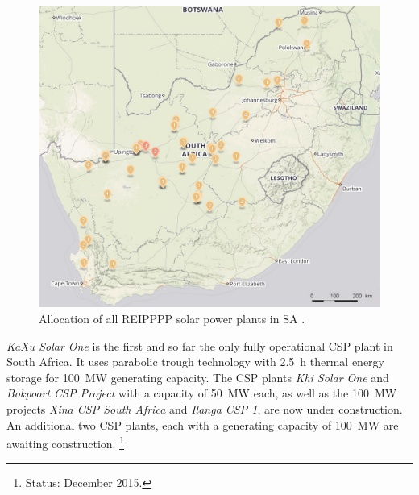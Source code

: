 \begin{figure}[h!]
\centering
\includegraphics[width=1\linewidth]{FIG/Solar-map}
\caption[Allocation of all REIPPPP solar power plants in SA.]{Allocation of all REIPPPP solar power plants in SA \cite{Forder2015}.}\label{Solar-map}
\end{figure}


\emph{KaXu Solar One} is the first and so far the only fully operational CSP plant in South Africa. It uses parabolic trough technology with \SI{2.5}{\hour} thermal energy storage for \SI{100}{\mega\watt} generating capacity. The CSP plants \emph{Khi Solar One} and \emph{Bokpoort CSP Project} with a capacity of \SI{50}{\mega\watt} each, as well as the \SI{100}{\mega\watt} projects \emph{Xina CSP South Africa} and \emph{Ilanga CSP 1}, are now under construction. An additional two CSP plants, each with a generating capacity of \SI{100}{\mega\watt} are awaiting construction. \cite{Forder2015}\footnote{Status: December 2015.}

